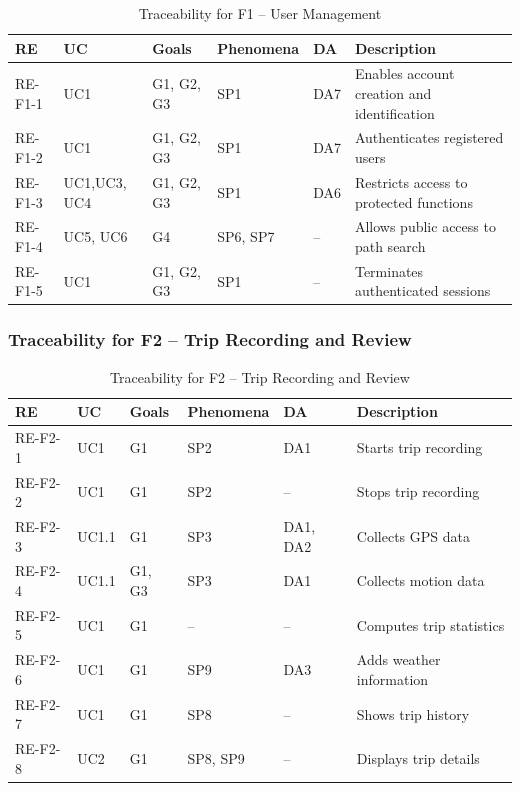 \begin{table}[H]
\centering
\caption{Traceability for F1 -- User Management}
\label{tab:trace_f1}
  \begin{tabular}{@{}p{1.6cm}p{2cm}p{2.5cm}p{2.2cm}p{1cm}p{4cm}@{}}
  \toprule
  \textbf{RE} & \textbf{UC} & \textbf{Goals} & \textbf{Phenomena} & \textbf{DA} & \textbf{Description} \\
  \midrule
  RE-F1-1 & UC1 & G1, G2, G3 & SP1 & DA7 & Enables account creation and identification \\
  RE-F1-2 & UC1 & G1, G2, G3 & SP1 & DA7 & Authenticates registered users \\
  RE-F1-3 & UC1,UC3, UC4 & G1, G2, G3 & SP1 & DA6 & Restricts access to protected functions \\
  RE-F1-4 & UC5, UC6 & G4 & SP6, SP7 & -- & Allows public access to path search \\
  RE-F1-5 & UC1 & G1, G2, G3 & SP1 & -- & Terminates authenticated sessions \\
  \bottomrule
  \end{tabular}
\end{table}


\subsubsection{Traceability for F2 -- Trip Recording and Review}

\begin{table}[H]
\centering
\caption{Traceability for F2 -- Trip Recording and Review}
\label{tab:trace_f2}
  \begin{tabular}{@{}p{1.6cm}p{2cm}p{2.5cm}p{2.2cm}p{1cm}p{4cm}@{}}
  \toprule
  \textbf{RE} & \textbf{UC} & \textbf{Goals} & \textbf{Phenomena} & \textbf{DA} & \textbf{Description} \\
  \midrule
  RE-F2-1 & UC1 & G1 & SP2 & DA1 & Starts trip recording \\
  RE-F2-2 & UC1 & G1 & SP2 & -- & Stops trip recording \\
  RE-F2-3 & UC1.1 & G1 & SP3 & DA1, DA2 & Collects GPS data \\
  RE-F2-4 & UC1.1 & G1, G3 & SP3 & DA1 & Collects motion data \\
  RE-F2-5 & UC1 & G1 & -- & -- & Computes trip statistics \\
  RE-F2-6 & UC1 & G1 & SP9 & DA3 & Adds weather information \\
  RE-F2-7 & UC1 & G1 & SP8 & -- & Shows trip history \\
  RE-F2-8 & UC2 & G1 & SP8, SP9 & -- & Displays trip details \\
  \bottomrule
  \end{tabular}
\end{table}


